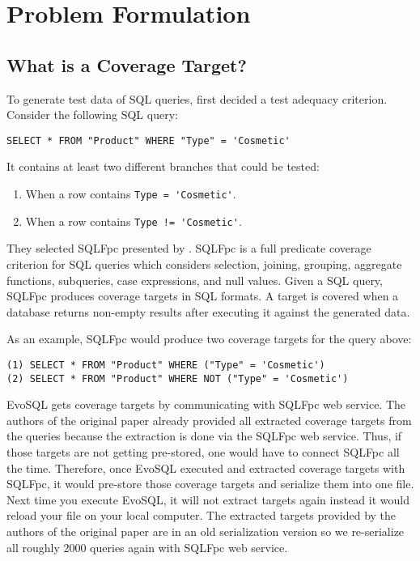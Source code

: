 \chapter{Problem Formulation}

\section{What is a Coverage Target?}
\label{sec:what_is_a_coverage_target}

To generate test data of SQL queries, \cite{castelein2018search} first decided a test adequacy criterion. Consider the following SQL query:

\begin{verbatim}
SELECT * FROM "Product" WHERE "Type" = 'Cosmetic'
\end{verbatim}
It contains at least two different branches that could be tested:
\begin{enumerate}
	\item[(1)] When a row contains \verb|Type = 'Cosmetic'|.
	\item[(2)] When a row contains \verb|Type != 'Cosmetic'|.
\end{enumerate}
They selected SQLFpc presented by \cite{de2010constraint}. SQLFpc is a full predicate coverage criterion for SQL queries which considers selection, joining, grouping, aggregate functions, subqueries, case expressions, and null values. Given a SQL query, SQLFpc produces coverage targets in SQL formats. A target is covered when a database returns non-empty results after executing it against the generated data.

As an example, SQLFpc would produce two coverage targets for the query above:
\begin{verbatim}
(1) SELECT * FROM "Product" WHERE ("Type" = 'Cosmetic')
(2) SELECT * FROM "Product" WHERE NOT ("Type" = 'Cosmetic')
\end{verbatim}

EvoSQL gets coverage targets by communicating with SQLFpc web service. The authors of the original paper already provided all extracted coverage targets from the queries because the extraction is done via the SQLFpc web service. Thus, if those targets are not getting pre-stored, one would have to connect SQLFpc all the time. Therefore, once EvoSQL executed and extracted coverage targets with SQLFpc, it would pre-store those coverage targets and serialize them into one file. Next time you execute EvoSQL, it will not extract targets again instead it would reload your file on your local computer. 
The extracted targets provided by the authors of the original paper are in an old serialization version so we re-serialize all roughly 2000 queries again with SQLFpc web service.

